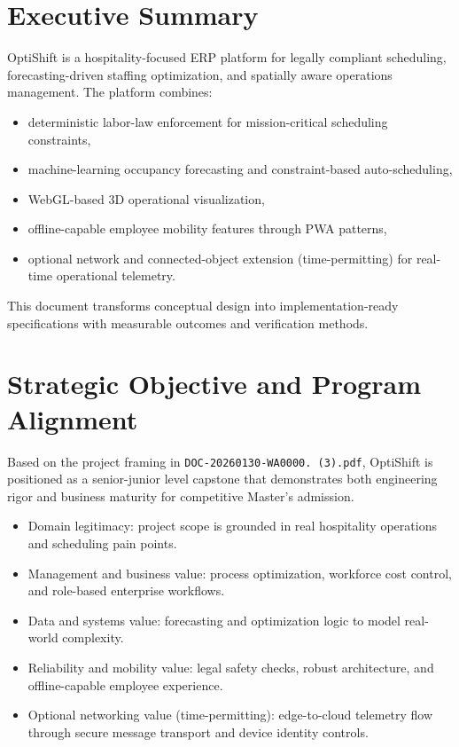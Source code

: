 \documentclass[11pt,a4paper]{article}
\begin{document}
\section{Executive Summary}
OptiShift is a hospitality-focused ERP platform for legally compliant scheduling, forecasting-driven staffing optimization, and spatially aware operations management.
The platform combines:
\begin{itemize}
  \item deterministic labor-law enforcement for mission-critical scheduling constraints,
  \item machine-learning occupancy forecasting and constraint-based auto-scheduling,
  \item WebGL-based 3D operational visualization,
  \item offline-capable employee mobility features through PWA patterns,
  \item optional network and connected-object extension (time-permitting) for real-time operational telemetry.
\end{itemize}

This document transforms conceptual design into implementation-ready specifications with measurable outcomes and verification methods.

\section{Strategic Objective and Program Alignment}
Based on the project framing in \texttt{DOC-20260130-WA0000. (3).pdf}, OptiShift is positioned as a senior-junior level capstone that demonstrates both engineering rigor and business maturity for competitive Master's admission.

\begin{itemize}
  \item Domain legitimacy: project scope is grounded in real hospitality operations and scheduling pain points.
  \item Management and business value: process optimization, workforce cost control, and role-based enterprise workflows.
  \item Data and systems value: forecasting and optimization logic to model real-world complexity.
  \item Reliability and mobility value: legal safety checks, robust architecture, and offline-capable employee experience.
  \item Optional networking value (time-permitting): edge-to-cloud telemetry flow through secure message transport and device identity controls.
\end{itemize}
\end{document}
